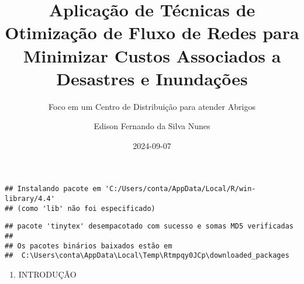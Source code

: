 \documentclass[
]{article}
\title{Aplicação de Técnicas de Otimização de Fluxo de Redes para
Minimizar Custos Associados a Desastres e Inundações}
\subtitle{Foco em um Centro de Distribuição para atender Abrigos}
\author{Edison Fernando da Silva Nunes}
\date{2024-09-07}
\begin{document}
\maketitle

\begin{verbatim}
## Instalando pacote em 'C:/Users/conta/AppData/Local/R/win-library/4.4'
## (como 'lib' não foi especificado)
\end{verbatim}

\begin{verbatim}
## pacote 'tinytex' desempacotado com sucesso e somas MD5 verificadas
## 
## Os pacotes binários baixados estão em
##  C:\Users\conta\AppData\Local\Temp\Rtmpqy0JCp\downloaded_packages
\end{verbatim}

\begin{enumerate}
\def\labelenumi{\arabic{enumi}.}
\item
  INTRODUÇÃO


\end{enumerate}
\end{document}
